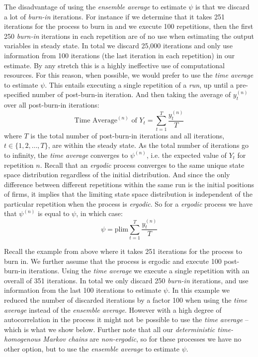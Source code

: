 \documentclass[preprint, 12pt]{elsarticle}
\begin{document}
The disadvantage of using the \emph{ensemble average} to estimate $\psi$ is that we discard a lot of \emph{burn-in} iterations. For instance if we determine that it takes 251 iterations for the process to burn in and we execute 100 repetitions, then the first 250 \emph{burn-in} iterations in each repetition are of no use when estimating the output variables in steady state. In total we discard 25,000 iterations and only use information from 100 iterations (the last iteration in each repetition) in our estimate. By any stretch this is a highly ineffective use of computational resources. For this reason, when possible, we would prefer to use the \emph{time average} to estimate $\psi$. This entails executing a single repetition of a \emph{run}, up until a pre-specified number of post-burn-in iteration. And then taking the average of $y_t^{(n)}$ over all post-burn-in iterations:
\begin{equation}
\mbox{Time Average}^{(n)} \mbox{ of } Y_t = \sum\limits_{t = 1}^T {\frac{ y_t^{(n)} }{ T }}
\end{equation}
where $T$ is the total number of post-burn-in iterations and all iterations, $t \in \{1,2, \dots, T\}$, are within the steady state. As the total number of iterations go to infinity, the \emph{time average} converges to $\psi^{(n)}$, i.e. the expected value of $Y_t$ for repetition $n$. Recall that an \emph{ergodic} process converges to the same unique state space distribution regardless of the initial distribution. And since the only difference between different repetitions within the same run is the initial positions of firms, it implies that the limiting state space distribution is independent of the particular repetition when the process is \emph{ergodic}. So for a \emph{ergodic} process we have that $\psi^{(n)}$ is equal to $\psi$, in which case:
$$\psi = \mbox{plim} \sum\limits_{t = 1}^T {\frac{ y_t^{(n)} }{ T }}$$

Recall the example from above where it takes 251 iterations for the process to burn in. We further assume that the process is ergodic and execute 100 post-burn-in iterations. Using the \emph{time average} we execute a single repetition with an overall of 351 iterations. In total we only discard 250 \emph{burn-in} iterations, and use information from the last 100 iterations to estimate $\psi$. In this example we reduced the number of discarded iterations by a factor 100 when using the \emph{time average} instead of the \emph{ensemble average}. However with a high degree of autocorrelation in the process it might not be possible to use the \emph{time average} -- which is what we show below. Further note that all our \emph{deterministic time-homogenous Markov chains} are \emph{non-ergodic}, so for these processes we have no other option, but to use the \emph{ensemble average} to estimate $\psi$.
\end{document}
